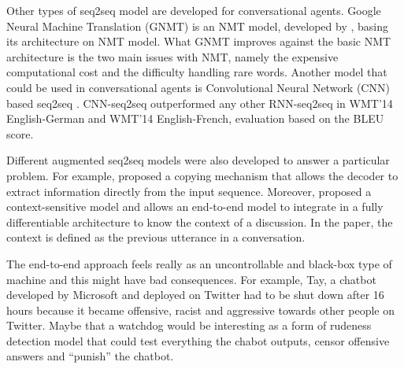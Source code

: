 Other types of seq2seq model are developed for conversational agents. Google Neural Machine Translation (GNMT) is an NMT model, developed by \citet{gnmt-1609.08144}, basing its architecture on \citet{nmt-phd} NMT model.
What GNMT improves against the basic NMT architecture is the two main issues with NMT, namely the expensive computational cost and the difficulty handling rare words.
Another model that could be used in conversational agents is Convolutional Neural Network (CNN) based seq2seq \citep{cnn-seq2seq-1705.03122}. CNN-seq2seq outperformed any other RNN-seq2seq in WMT'14 English-German and WMT'14 English-French, evaluation based on the BLEU score.

Different augmented seq2seq models were also developed to answer a particular problem. For example, \citet{1603.06393} proposed a copying mechanism that allows the decoder to extract information directly from the input sequence.
Moreover, \citet{1506.06714} proposed a context-sensitive model and allows an end-to-end model to integrate in a fully differentiable architecture to know the context of a discussion. In the paper, the context is defined as the previous utterance in a conversation.




The end-to-end approach feels really as an uncontrollable and black-box type of machine and this might have bad consequences.
For example, Tay, a chatbot developed by Microsoft and deployed on Twitter had to be shut down after 16 hours because it became offensive, racist and aggressive towards other people on Twitter.
Maybe that a watchdog would be interesting as a form of rudeness detection model that could test everything the chabot outputs, censor offensive answers and ``punish'' the chatbot.


